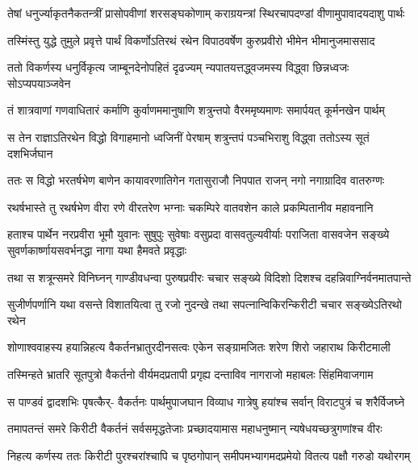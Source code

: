 \fourlineindentedshloka
{तेषां धनुर्ज्याकृतनैकतन्त्रीं}
{प्रासोपवीणां शरसङ्घकोणाम्}
{कराग्रयन्त्रां स्थिरचापदण्डां}
{वीणामुपावादयदाशु पार्थः}


\fourlineindentedshloka
{तस्मिंस्तु युद्धे तुमुले प्रवृत्ते}
{पार्थं विकर्णोऽतिरथं रथेन}
{विपाठवर्षेण कुरुप्रवीरो}
{भीमेन भीमानुजमाससाद}


\fourlineindentedshloka
{ततो विकर्णस्य धनुर्विकृत्य}
{जाम्बूनदेनोपहितं दृढज्यम्}
{न्यपातयत्तद्ध्वजमस्य विद्ध्वा}
{छिन्नध्वजः सोऽप्यपयाञ्जवेन}


\fourlineindentedshloka
{तं शात्रवाणां गणवाधितारं}
{कर्माणि कुर्वाणममानुषाणि}
{शत्रुन्तपो वैरममृष्यमाणः}
{समार्पयत् कूर्मनखेन पार्थम्}


\fourlineindentedshloka
{स तेन राज्ञाऽतिरथेन विद्धो}
{विगाहमानो ध्वजिनीं पेरषाम्}
{शत्रुन्तपं पञ्चभिराशु विद्ध्वा}
{ततोऽस्य सूतं दशभिर्जघान}


\fourlineindentedshloka
{ततः स विद्धो भरतर्षभेण}
{बाणेन कायावरणातिगेन}
{गतासुराजौ निपपात राजन्}
{नगो नगाग्रादिव वातरुग्णः}


\fourlineindentedshloka
{रथर्षभास्ते तु रथर्षभेण}
{वीरा रणे वीरतरेण भग्नाः}
{चकम्पिरे वातवशेन काले}
{प्रकम्पितानीव महावनानि}


\sixlineindentedshloka
{हताश्च पार्थेन नरप्रवीरा}
{भूमौ युवानः सुषुपुः सुवेषाः}
{वसुप्रदा वासवतुल्यवीर्याः}
{पराजिता वासवजेन सङ्ख्ये}
{सुवर्णकार्ष्णायसवर्भनद्धा}
{नागा यथा हैमवते प्रवृद्धाः}


\fourlineindentedshloka
{तथा स शत्रून्समरे विनिघ्नन्}
{गाण्डीवधन्वा पुरुषप्रवीरः}
{चचार सङ्ख्ये विदिशो दिशश्च}
{दहन्निवाग्निर्वनमातपान्ते}


\fourlineindentedshloka
{सुजीर्णपर्णानि यथा वसन्ते}
{विशातयित्वा तु रजो नुदन्खे}
{तथा सपत्नान्विकिरन्किरीटी}
{चचार सङ्ख्येऽतिरथो रथेन}


\fourlineindentedshloka
{शोणाश्ववाहस्य हयान्निहत्य}
{वैकर्तनभ्रातुरदीनसत्वः}
{एकेन सङ्ग्रामजितः शरेण}
{शिरो जहाराथ किरीटमाली}


\fourlineindentedshloka
{तस्मिन्हते भ्रातरि सूतपुत्रो}
{वैकर्तनो वीर्यमदप्रतापी}
{प्रगृह्य दन्ताविव नागराजो}
{महाबलः सिंहमिवाजगाम}


\fourlineindentedshloka
{स पाण्डवं द्वादशभिः पृषत्कैर्-}
{वैकर्तनः पार्थमुपाजघान}
{विव्याध गात्रेषु हयांश्च सर्वान्}
{विराटपुत्रं च शरैर्विजघ्ने}


\fourlineindentedshloka
{तमापतन्तं समरे किरीटी}
{वैकर्तनं सर्वसमृद्धतेजाः}
{प्रच्छादयामास महाधनुष्मान्}
{न्यषेधयच्छत्रुगणांश्च वीरः}


\fourlineindentedshloka
{निहत्य कर्णस्य ततः किरीटी}
{पुरश्चरांश्चापि च पृष्ठगोपान्}
{समीपमभ्यागमदप्रमेयो}
{वितत्य पक्षौ गरुडो यथोरगम्}


